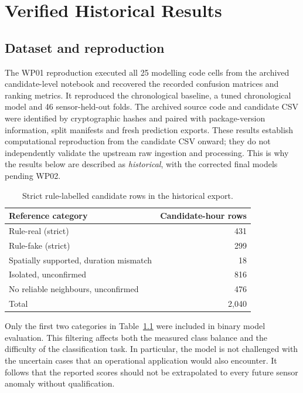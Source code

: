 \documentclass[12pt,a4paper,oneside]{report}
\begin{document}
\chapter{Verified Historical Results}
\section{Dataset and reproduction}
The WP01 reproduction executed all 25 modelling code cells from the archived candidate-level notebook and recovered the recorded confusion matrices and ranking metrics. It reproduced the chronological baseline, a tuned chronological model and 46 sensor-held-out folds. The archived source code and candidate CSV were identified by cryptographic hashes and paired with package-version information, split manifests and fresh prediction exports. These results establish computational reproduction from the candidate CSV onward; they do not independently validate the upstream raw ingestion and processing. This is why the results below are described as \emph{historical}, with the corrected final models pending WP02.

\begin{table}[htbp]\centering\small
\caption{Strict rule-labelled candidate rows in the historical export.}\label{tab:labels}
\begin{tabular}{lr}\toprule Reference category & Candidate-hour rows\\\midrule
Rule-real (strict) & 431\\ Rule-fake (strict) & 299\\Spatially supported, duration mismatch & 18\\ Isolated, unconfirmed & 816\\ No reliable neighbours, unconfirmed & 476\\\midrule Total & 2,040\\\bottomrule\end{tabular}
\end{table}

Only the first two categories in Table~\ref{tab:labels} were included in binary model evaluation. This filtering affects both the measured class balance and the difficulty of the classification task. In particular, the model is not challenged with the uncertain cases that an operational application would also encounter. It follows that the reported scores should not be extrapolated to every future sensor anomaly without qualification.
\end{document}
